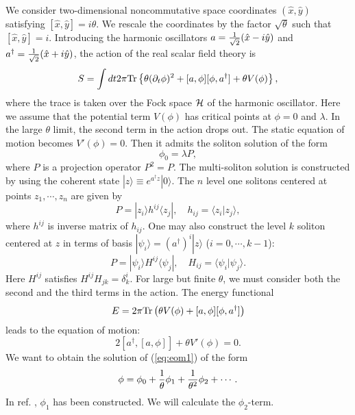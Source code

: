 \documentclass[a4paper,12pt]{article}
\begin{document}
We consider two-dimensional noncommutative
space coordinates $(\hat{x},\hat{y})$  satisfying
$
[\hat{x},\hat{y}]=i\theta.
$
We rescale the coordinates by the factor $\sqrt{\theta}$ such that
$
[\hat{x},\hat{y}]=i
$.
Introducing the harmonic oscillators
$a={1\over\sqrt{2}}(\hat{x}-i\hat{y})$ and
$a^{\dagger}={1\over\sqrt{2}}(\hat{x}+i\hat{y})$,
the action of the real scalar field theory is
\begin{equation}
 S=\int dt 2\pi {\rm Tr}\left\{ \theta (\partial_{t}\phi)^2
+[a,\phi] [\phi,a^{\dagger}]+\theta V(\phi)
\right\},
\end{equation}
where the trace is taken over the Fock space ${\cal H}$ of the harmonic
oscillator.
Here we assume that the potential term $V(\phi)$ has critical points
at $\phi=0$ and $\lambda$.
In the large $\theta$ limit, the second term in the action drops out.
The static equation of motion becomes $V'(\phi)=0$. Then
it admits the soliton solution of the form\cite{GMS}
\begin{equation}
 \phi_{0}=\lambda P,
\label{eq:sol0}
\end{equation}
where $P$ is a projection operator $P^2=P$.
The multi-soliton solution \cite{GHS} is constructed by using
the coherent state
$|z\rangle\equiv e^{a^{\dagger}z}|0\rangle$.
The $n$ level one solitons centered at points $z_{1},\cdots, z_{n}$ are
given by
\begin{equation}
P=|z_{i}\rangle h^{ij} \langle z_{j}|, \quad
h_{ij}=\langle z_{i} | z_{j} \rangle,
\label{eq:proj1}
\end{equation}
where $h^{ij}$ is inverse matrix of $h_{ij}$.
One may also construct the level $k$ soliton centered at $z$ in terms of
basis
$|\psi_{i}\rangle=(a^{\dagger})^{i}|z\rangle$ ($i=0,\cdots, k-1$):
\begin{equation}
 P=|\psi_{i}\rangle H^{ij} \langle \psi_{j}|, \quad
H_{ij}=\langle \psi_{i} | \psi_{j} \rangle.
\label{eq:proj2}
\end{equation}
Here $H^{ij}$ satisfies $H^{ij}H_{jk}=\delta^{i}_{k}$.
For large but finite $\theta$, we must consider both the second and the
third
terms in the action. The energy functional
\begin{equation}
 E=2\pi {\rm Tr}\left(\theta V(\phi)+[a,\phi] [\phi,a^{\dagger}] \right)
\label{eq:ener}
\end{equation}
leads to the equation of motion:
\begin{equation}
 2[a^{\dagger},[a,\phi]]+\theta V'(\phi)=0.
\label{eq:eom1}
\end{equation}
We want to obtain the solution of (\ref{eq:eom1}) of the
form
\begin{equation}
 \phi=\phi_{0}+{1\over\theta}\phi_{1}+{1\over\theta^2}\phi_{2}+\cdots .
\label{eq:sol1}
\end{equation}
In ref. \cite{HLRU},
$\phi_{1}$ has been constructed.
We will calculate the $\phi_{2}$-term.
\end{document}
